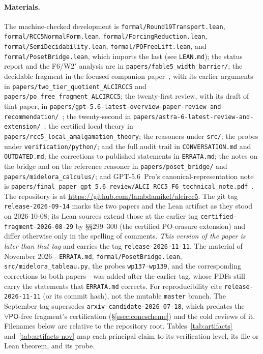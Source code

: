 \documentclass[11pt]{article}
\newcommand{\PO}{\mathsf{PO}}
\theoremstyle{plain}
\theoremstyle{definition}
\begin{document}
\paragraph{Materials.} The machine-checked development is
\texttt{formal/Round19Transport.lean}, \texttt{formal/RCC5NormalForm.lean},
\texttt{formal/ForcingReduction.lean}, \texttt{formal/SemiDecidability.lean},
\texttt{formal/POFreeLift.lean}, and \texttt{formal/PosetBridge.lean}, which
imports the last (see \texttt{LEAN.md}); the
status report and the F6/W2$'$ analysis are in
\texttt{papers/fable5\_width\_barrier/}; the decidable fragment in the focused companion
paper~\cite{PofreeFragmentPaper}, with its earlier arguments in
\texttt{papers/two\_tier\_quotient\_ALCIRCC5} and
\texttt{papers/po\_free\_fragment\_ALCIRCC5}; the twenty-first review,
with its draft of that paper, in
\texttt{papers/gpt-5.6-latest-overview-paper-review-and-recommendation/}~\cite{GPT56SolReview};
the twenty-second in
\texttt{papers/astra-6-latest-review-and-extension/}~\cite{Astra6Review};
the certified local theory
in \texttt{papers/rcc5\_local\_amalgamation\_theory}; the reasoners under
\texttt{src/}; the probes under \texttt{verification/python/}; and the
full audit trail in \texttt{CONVERSATION.md} and \texttt{OUTDATED.md}; the
corrections to published statements in \texttt{ERRATA.md}; the notes on the
bridge and on the reference reasoner in \texttt{papers/poset\_bridge/} and
\texttt{papers/midelora\_calculus/};
and GPT-5.6~Pro's canonical-representation note is
\texttt{papers/final\_paper\_gpt\_5.6\_review/ALCI\_RCC5\_F6\_technical\_note.pdf}~\cite{GPT56TechNote}.
The repository is at \url{https://github.com/lambdamikel/alcircc5}. The git
tag \texttt{release-2026-09-14} marks the two papers and the Lean artifact as
they stood on 2026-10-08; its Lean sources extend those at the earlier tag
\texttt{certified-fragment-2026-08-29} by \S\S299--300 (the certified
PO-erasure extension) and differ otherwise only in the spelling of comments.
\emph{This version of the paper is later than that tag} and carries the tag
\texttt{release-2026-11-11}. The material of November
2026---\texttt{ERRATA.md}, \texttt{formal/PosetBridge.lean},
\texttt{src/midelora\_tableau.py}, the probes
\texttt{wp137}--\texttt{wp139}, and the corresponding corrections to both
papers---was added after the earlier tag, whose PDFs still carry the
statements that \texttt{ERRATA.md} corrects. For reproducibility cite
\texttt{release-2026-11-11} (or its commit hash), not the mutable
\texttt{master} branch. The September tag supersedes
\texttt{arxiv-candidate-2026-07-18}, which predates the $\forall\PO$-free
fragment's certification (\S\ref{ssec:conescheme}) and the cold reviews of
it. Filenames below are relative to the repository root.
Tables~\ref{tab:artifacts} and~\ref{tab:artifacts-nov} map each principal
claim to its verification level, its file or Lean theorem, and its probe.
\end{document}
